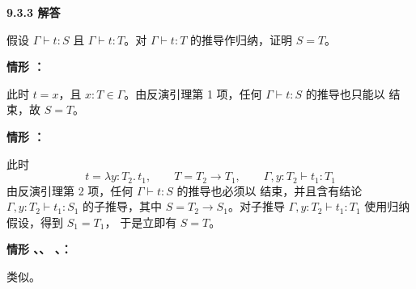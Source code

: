 \begin{taplauthorsolutionentrybox}
\label{sol:author:9.3.3}
\textbf{9.3.3 解答}

假设 \(\Gamma\vdash t:S\) 且 \(\Gamma\vdash t:T\)。对
\(\Gamma\vdash t:T\) 的推导作归纳，证明 \(S=T\)。

\medskip\noindent
\textbf{情形 ：}

此时 \(t=x\)，且 \(x:T\in\Gamma\)。由反演引理第 1 项，任何
\(\Gamma\vdash t:S\) 的推导也只能以  结束，故
\(S=T\)。

\medskip\noindent
\textbf{情形 ：}

此时
\[
  t=\lambda y:T_2.\,t_1,
  \qquad
  T=T_2\to T_1,
  \qquad
  \Gamma,y:T_2\vdash t_1:T_1
\]
由反演引理第 2 项，任何 \(\Gamma\vdash t:S\) 的推导也必须以
 结束，并且含有结论 \(\Gamma,y:T_2\vdash t_1:S_1\)
的子推导，其中 \(S=T_2\to S_1\)。对子推导
\(\Gamma,y:T_2\vdash t_1:T_1\) 使用归纳假设，得到 \(S_1=T_1\)，
于是立即有 \(S=T\)。

\medskip\noindent
\textbf{情形 、、
、：}

类似。

\end{taplauthorsolutionentrybox}

